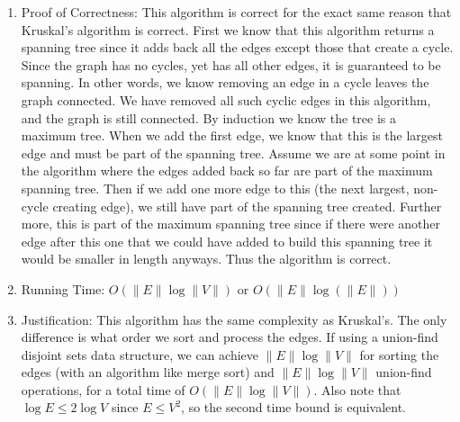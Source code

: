 \documentclass[11pt]{article}
\begin{document}
\begin{enumerate}
\item Proof of Correctness: This algorithm is correct for the exact same reason that Kruskal's algorithm is correct. First we know that this algorithm returns a spanning tree since it adds back all the edges except those that create a cycle. Since the graph has no cycles, yet has all other edges, it is guaranteed to be spanning. In other words, we know removing an edge in a cycle leaves the graph connected. We have removed all such cyclic edges in this algorithm, and the graph is still connected. By induction we know the tree is a maximum tree. When we add the first edge, we know that this is the largest edge and must be part of the spanning tree. Assume we are at some point in the algorithm where the edges added back so far are part of the maximum spanning tree. Then if we add one more edge to this (the next largest, non-cycle creating edge), we still have part of the spanning tree created. Further more, this is part of the maximum spanning tree since if there were another edge after this one that we could have added to build this spanning tree it would be smaller in length anyways. Thus the algorithm is correct.
\item Running Time: $O(\|E\| \log \|V\|)$ or $O(\|E\| \log (\|E\|))$ 
\item Justification: This algorithm has the same complexity as Kruskal's. The only difference is what order we sort and process the edges. If using a union-find disjoint sets data structure, we can achieve $\|E\|\log \|V\|$ for sorting the edges (with an algorithm like merge sort) and $\|E\|\log \|V\|$ union-find operations, for a total time of $O(\|E\|\log \|V\|)$. Also note that $\log E \leq 2 \log V$ since $E \leq V^2$, so the second time bound is equivalent.
\end{enumerate}


\newpage
\end{document}
